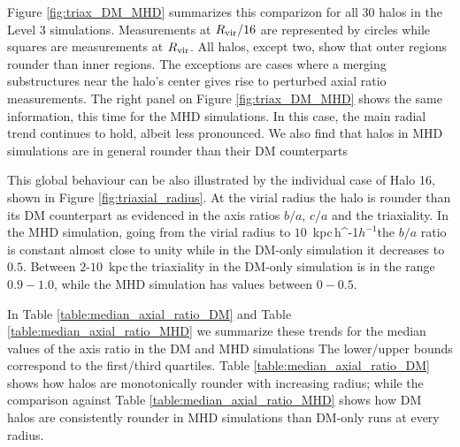 \documentclass[a4paper,fleqn,usenatbib]{mnras}
\newcommand{\kpch}{\,{\rm kpc}\,\ifmmode h^{-1}\else $h^{-1}$\fi}
\newcommand{\kpc}{\,{\rm kpc}\,}
\begin{document}
Figure \ref{fig:triax_DM_MHD} summarizes this comparizon for all 30 halos
in the Level 3 simulations. 
Measurements at $R_{\rm vir}/16$ are represented by circles while squares 
are measurements at $R_{\rm vir}$. 
All halos, except two, show that outer regions rounder than inner
regions.
The exceptions are cases where a merging substructures near  the
halo's center gives rise to perturbed axial ratio measurements. 
The right panel on Figure \ref{fig:triax_DM_MHD} shows the same information, this time for
the MHD simulations. 
In this case, the main radial trend continues to hold, albeit less
pronounced.
We also find that halos in MHD simulations are in general rounder than
their DM counterparts


This global behaviour can be also illustrated by the individual case
of Halo 16, shown in Figure \ref{fig:triaxial_radius}.
At the virial radius the halo is rounder than its DM counterpart as
evidenced in the axis ratios $b/a$, $c/a$ and the triaxiality.
In the MHD simulation, going from the virial radius to $10$ \kpch the
$b/a$ ratio is constant almost close to unity while in the DM-only
simulation it decreases to $0.5$.
Between $2$-$10$ \kpc the triaxiality in the DM-only simulation is in
the range $0.9-1.0$, while the MHD simulation has values between
$0-0.5$. 


In Table \ref{table:median_axial_ratio_DM} and Table \ref{table:median_axial_ratio_MHD}
we summarize these trends for the median values of the axis ratio in
the DM and MHD simulations
The lower/upper bounds correspond to the first/third quartiles. 
Table  \ref{table:median_axial_ratio_DM} shows how halos are
monotonically rounder with increasing radius; while the comparison
against Table \ref{table:median_axial_ratio_MHD} shows how DM halos
are consistently rounder in MHD simulations than DM-only runs at every
radius. 
\end{document}
